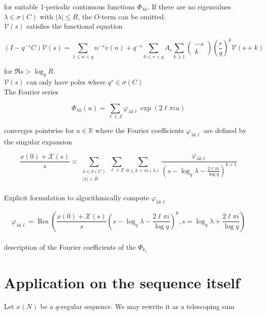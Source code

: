 for suitable 1-periodic continuous functions $\Phi_{\lambda k}$. If there are no eigenvalues $\lambda \in \sigma(C)$ with $|\lambda| \leq R$, the $O$-term can be omitted.
\\

$\mathcal{V}(s)$ satisfies the functional equation

$$
\left(I-q^{-s} C\right) \mathcal{V}(s)=\sum_{1 \leq n<q} n^{-s} v(n)+q^{-s} \sum_{0 \leq r<q} A_{r} \sum_{k \geq 1}\left(\begin{array}{c}
	-s \\
	k
\end{array}\right)\left(\frac{r}{q}\right)^{k} \mathcal{V}(s+k)
$$

for $\Re s>\log _{q} R$.
\\

$\mathcal{V}(s)$ can only have poles where $q^{s} \in \sigma(C)$
\\

The Fourier series

$$
\Phi_{\lambda k}(u)=\sum_{\ell \in \mathbb{Z}} \varphi_{\lambda k \ell} \exp (2 \ell \pi i u)
$$

converges pointwise for $u \in \mathbb{R}$ where the Fourier coefficients $\varphi_{\lambda k \ell}$ are defined by the singular expansion

$$
\frac{x(0)+\mathcal{X}(s)}{s} \asymp \sum_{\substack{\lambda \in \sigma(C) \\|\lambda|>R}} \sum_{\ell \in \mathbb{Z}} \sum_{0 \leq k<m(\lambda)} \frac{\varphi_{\lambda k \ell}}{\left(s-\log _{q} \lambda-\frac{2 \ell \pi i}{\log q}\right)^{k+1}}
$$
\\

Explicit formulation to algorithmically compute $\varphi_{\lambda k \ell}$

$$
\varphi_{\lambda k \ell}=\operatorname{Res}\left(\frac{x(0)+\mathcal{X}(s)}{s}\left(s-\log _{q} \lambda-\frac{2 \ell \pi i}{\log q}\right)^{k}, s=\log _{q} \lambda+\frac{2 \ell \pi i}{\log q}\right)
$$
\\
 
description of the Fourier coefficients of the $\Phi_{k_{j}}$

\section{Application on the sequence itself}

Let $x(N)$ be a $q$-regular sequence. We may rewrite it as a telescoping sum

